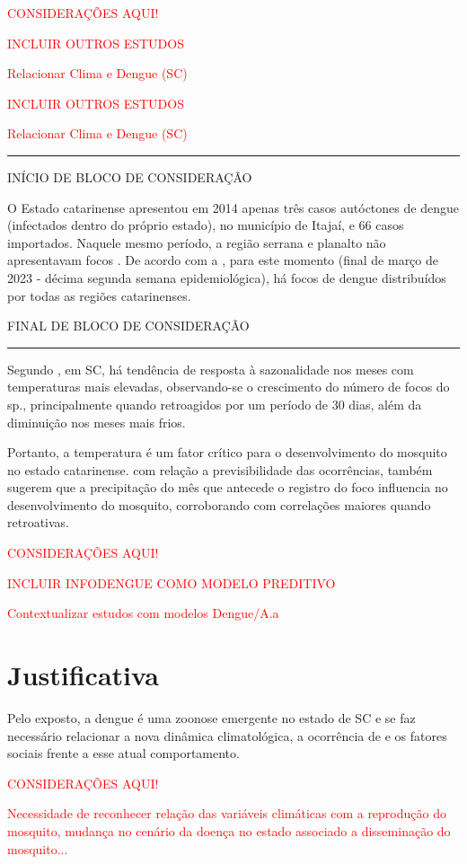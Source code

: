 \begin{center}
\textcolor{red}{CONSIDERAÇÕES AQUI!}
\end{center}

\textcolor{red}{INCLUIR OUTROS ESTUDOS}

\textcolor{red}{Relacionar Clima e Dengue (SC)}

\textcolor{red}{INCLUIR OUTROS ESTUDOS}

\textcolor{red}{Relacionar Clima e Dengue (SC)}

{\color{red} \rule{\linewidth}{0.5mm}}

\color{red} INÍCIO DE BLOCO DE CONSIDERAÇÃO

\indent O Estado catarinense apresentou em 2014 apenas três casos autóctones de dengue (infectados dentro do próprio estado), no município de Itajaí, e 66 casos importados. Naquele mesmo período, a região serrana e planalto não apresentavam focos \cite{Matiola2020Dissertação}. De acordo com a , para este momento (final de março de 2023 - décima segunda semana epidemiológica), há focos de dengue distribuídos por todas as regiões catarinenses.

FINAL DE BLOCO DE CONSIDERAÇÃO

{\color{red} \rule{\linewidth}{0.5mm}}

\color{black}

\indent Segundo , em \acrlong{SC}, há tendência de resposta à sazonalidade nos meses com temperaturas mais elevadas, observando-se o crescimento do número de focos do  sp.,  principalmente quando retroagidos por um período de 30 dias, além da diminuição nos meses mais frios.

\indent Portanto, a temperatura é um fator crítico para o desenvolvimento do mosquito no estado catarinense. com relação a previsibilidade das ocorrências,  também sugerem que a precipitação do mês que antecede o registro do foco influencia no desenvolvimento do mosquito, corroborando com correlações maiores quando retroativas.

\begin{center}
\textcolor{red}{CONSIDERAÇÕES AQUI!}
\end{center}
\textcolor{red}{INCLUIR INFODENGUE COMO MODELO PREDITIVO}

\textcolor{red}{Contextualizar estudos com modelos Dengue/A.a}
\newpage
\section{Justificativa}
\indent Pelo exposto, a dengue é uma zoonose emergente no estado de \acrlong{SC} e se faz necessário relacionar a nova dinâmica climatológica, a ocorrência de  e os fatores sociais frente a esse atual comportamento.
\begin{center}
\textcolor{red}{CONSIDERAÇÕES AQUI!}
\end{center}
\textcolor{red}{Necessidade de reconhecer relação das variáveis climáticas com a reprodução do mosquito, mudança no cenário da doença no estado associado a disseminação do mosquito...}

